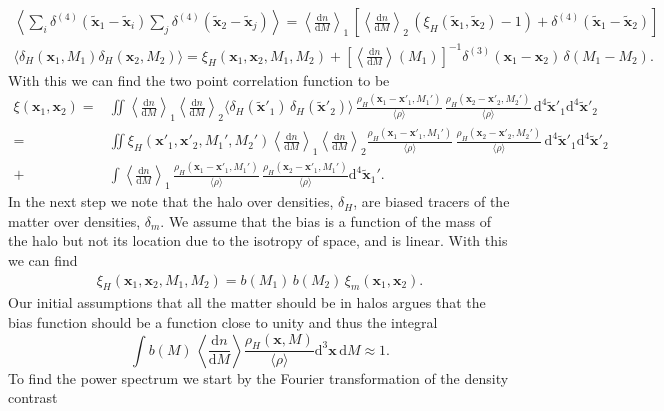 \documentclass[oneside]{book}
\newcommand*{\rd}{\mathrm{d}}
\begin{document}
\begin{align}
    \left\langle\sum_i \delta^{(4)}(\tilde{\boldsymbol{x}}_1-\tilde{\boldsymbol{x}}_i)\sum_j \delta^{(4)}(\tilde{\boldsymbol{x}}_2-\tilde{\boldsymbol{x}}_j)\right\rangle = \left\langle \frac{\rd n}{\rd M} \right\rangle_1\,\left[\left\langle \frac{\rd n}{\rd M} \right\rangle_2\,( \xi_H(\tilde{\boldsymbol{x}}_1,\tilde{\boldsymbol{x}}_2) -1 )+\delta^{(4)}(\tilde{\boldsymbol{x}}_1-\tilde{\boldsymbol{x}}_2)\right] \\
    \langle \delta_H(\boldsymbol{x}_1,M_1) \delta_H(\boldsymbol{x}_2,M_2) \rangle = \xi_H(\boldsymbol{x}_1,\boldsymbol{x}_2,M_1,M_2)+ \left[\left\langle \frac{\rd n}{\rd M} \right\rangle\!(M_1) \right]^{-1}\!\! \delta^{(3)}(\boldsymbol{x}_1-\boldsymbol{x}_2)\,\delta(M_1-M_2). \label{eq:two-point-halo-seed-density}
\end{align}
With this we can find the two point correlation function to be
\begin{align}
    \xi(\boldsymbol{x}_1,\boldsymbol{x}_2) =& \iint \left\langle \frac{\rd n}{\rd M} \right\rangle_1\!\!\left\langle  \frac{\rd n}{\rd M} \right\rangle_2\!\!
    \langle\delta_H(\tilde{\boldsymbol{x}}'_1)\,\delta_H(\tilde{\boldsymbol{x}}'_2)\rangle \,\frac{\rho_H(\boldsymbol{x}_1-\boldsymbol{x}'_1,M_1')}{\langle \rho \rangle} \,\frac{\rho_H(\boldsymbol{x}_2-\boldsymbol{x}'_2,M_2')}{\langle \rho \rangle}\, \rd^4\tilde{\boldsymbol{x}}'_1 \rd^4\tilde{\boldsymbol{x}}'_2 \nonumber\\
    =&\iint \xi_H(\boldsymbol{x}'_1,\boldsymbol{x}'_2,M_1',M_2') \left\langle \frac{\rd n}{\rd M} \right\rangle_1\!\!\left\langle \frac{\rd n}{\rd M} \right\rangle_2 \!\!\frac{\rho_H(\boldsymbol{x}_1-\boldsymbol{x}'_1,M_1')}{\langle \rho \rangle} \,\frac{\rho_H(\boldsymbol{x}_2-\boldsymbol{x}'_2,M_2')}{\langle \rho \rangle}\, \rd^4\tilde{\boldsymbol{x}}'_1 \rd^4\tilde{\boldsymbol{x}}'_2 \nonumber \\
    +&\int \left\langle \frac{\rd n}{\rd M} \right\rangle_1\,\frac{\rho_H(\boldsymbol{x}_1-\boldsymbol{x}'_1,M_1')}{\langle \rho \rangle}\,\frac{\rho_H(\boldsymbol{x}_2-\boldsymbol{x}'_1,M_1')}{\langle \rho \rangle} \rd^4 \tilde{\boldsymbol{x}}_1'.
\end{align}
In the next step we note that the halo over densities, $\delta_H$, are biased tracers of the matter over densities, $\delta_m$. We assume that the bias is a function of the mass of the halo but not its location due to the isotropy of space, and is linear. With this we can find \begin{align*}
    \xi_H(\boldsymbol{x}_1,\boldsymbol{x}_2,M_1,M_2) = b(M_1)\,b(M_2)\,\xi_m(\boldsymbol{x}_1,\boldsymbol{x}_2). 
\end{align*}
Our initial assumptions that all the matter should be in halos argues that the bias function should be a function close to unity and thus the integral 
\begin{equation}
\int b(M)\,\left\langle\frac{\rd n}{\rd M}\right\rangle \frac{\rho_H(\boldsymbol{x},M)}{\langle\rho\rangle} \rd^3\boldsymbol{x}\,\rd M \approx 1. \label{eq:two-halo-integral}
\end{equation}
To find the power spectrum we start by the Fourier transformation of the density contrast 
\end{document}
